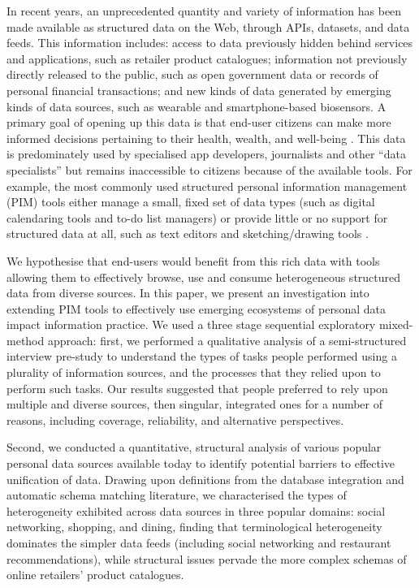 \documentclass{sigchi}
\begin{document}
In recent years, an unprecedented quantity and variety of information has been made available as structured data on the Web, through APIs, datasets, and data feeds.  This information includes: access to data previously hidden behind services and applications, such as retailer product catalogues; information not previously directly released to the public, such as open government data or records of personal financial transactions; and new kinds of data generated by emerging kinds of data sources, such as wearable and smartphone-based biosensors.  A primary goal of opening up this data is that end-user citizens can make more informed decisions pertaining to their health, wealth, and well-being \cite{}.  This data is predominately used by specialised app developers, journalists and other ``data specialists'' but remains inaccessible to citizens because of the available tools.  For example, the most commonly used structured personal information management (PIM) tools either manage a small, fixed set of data types (such as digital calendaring tools and  to-do list managers) or provide little or no support for structured data at all, such as text editors and sketching/drawing tools \cite{}.   

We hypothesise that end-users would benefit from this rich data with tools allowing them to effectively browse, use and consume heterogeneous structured data from diverse sources.  In this paper, we present an investigation into extending PIM tools to effectively use emerging ecosystems of personal data impact information practice.  We used a three stage sequential exploratory mixed-method approach: first, we performed a qualitative analysis of a semi-structured interview pre-study to understand the types of tasks people performed using a plurality of  information sources, and the processes that they relied upon to perform such tasks.  Our results suggested that people preferred to rely upon multiple and diverse sources, then singular, integrated ones for a number of reasons, including coverage, reliability, and alternative perspectives.  

Second, we conducted a quantitative, structural analysis of various popular personal data sources available today to identify potential barriers to effective unification of data.  Drawing upon definitions from the database integration and automatic schema matching literature, we characterised the types of heterogeneity exhibited across data sources in three popular domains: social networking, shopping, and dining, finding that terminological heterogeneity dominates the simpler data feeds (including social networking and restaurant recommendations), while structural issues pervade the more complex schemas of online retailers' product catalogues.
\end{document}
